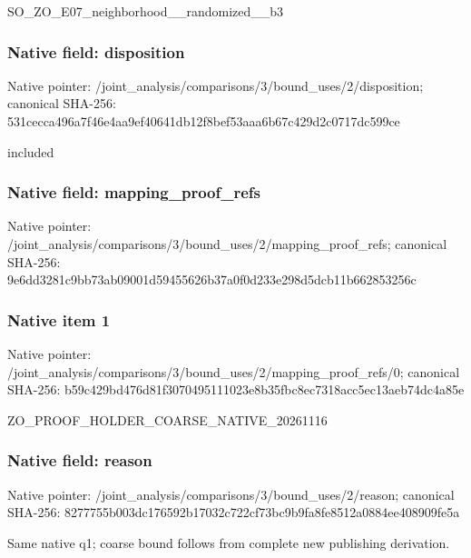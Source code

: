 \documentclass[10pt,a4paper]{article}
\begin{document}
\begingroup\raggedright\sloppy SO\_\allowbreak{}ZO\_\allowbreak{}E07\_\allowbreak{}neighborhood\_\allowbreak{}\_\allowbreak{}randomized\_\allowbreak{}\_\allowbreak{}b3\par\endgroup

\subsubsection{Native field: disposition}
Native pointer: /joint\_\allowbreak{}analysis/comparisons/3/bound\_\allowbreak{}uses/2/disposition; canonical SHA-256: 531cecca496a7f46e4aa9ef40641db12f8bef53aaa6b67c429d2c0717dc599ce

\begingroup\raggedright\sloppy included\par\endgroup

\subsubsection{Native field: mapping\_\allowbreak{}proof\_\allowbreak{}refs}
Native pointer: /joint\_\allowbreak{}analysis/comparisons/3/bound\_\allowbreak{}uses/2/mapping\_\allowbreak{}proof\_\allowbreak{}refs; canonical SHA-256: 9e6dd3281c9bb73ab09001d59455626b37a0f0d233e298d5dcb11b662853256c

\subsubsection{Native item 1}
Native pointer: /joint\_\allowbreak{}analysis/comparisons/3/bound\_\allowbreak{}uses/2/mapping\_\allowbreak{}proof\_\allowbreak{}refs/0; canonical SHA-256: b59c429bd476d81f3070495111023e8b35fbc8ec7318acc5ec13aeb74dc4a85e

\begingroup\raggedright\sloppy ZO\_\allowbreak{}PROOF\_\allowbreak{}HOLDER\_\allowbreak{}COARSE\_\allowbreak{}NATIVE\_\allowbreak{}20261116\par\endgroup

\subsubsection{Native field: reason}
Native pointer: /joint\_\allowbreak{}analysis/comparisons/3/bound\_\allowbreak{}uses/2/reason; canonical SHA-256: 8277755b003dc176592b17032c722cf73bc9b9fa8fe8512a0884ee408909fe5a

\begingroup\raggedright\sloppy Same native q1;\allowbreak{} coarse bound follows from complete new publishing derivation.\par\endgroup
\end{document}
